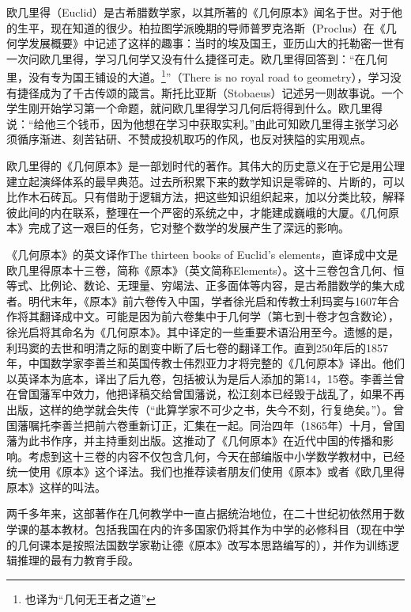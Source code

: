 \documentclass[b5paper]{ctexart}
\begin{document}
\begin{mdframed}

欧几里得（Euclid）是古希腊数学家，以其所著的《几何原本》闻名于世。对于他的生平，现在知道的很少。柏拉图学派晚期的导师普罗克洛斯（Proclus）在《几何学发展概要》中记述了这样的趣事：当时的埃及国王，亚历山大的托勒密一世有一次问欧几里得，学习几何学又没有什么捷径可走。欧几里得回答到：“在几何里，没有专为国王铺设的大道。\footnote{也译为“几何无王者之道”}”（There is no royal road to geometry），学习没有捷径成为了千古传颂的箴言。斯托比亚斯（Stobaeus）记述另一则故事说。一个学生刚开始学习第一个命题，就问欧几里得学习几何后将得到什么。欧几里得说：“给他三个钱币，因为他想在学习中获取实利。”由此可知欧几里得主张学习必须循序渐进、刻苦钻研、不赞成投机取巧的作风，也反对狭隘的实用观点\cite{Elements}。

欧几里得的《几何原本》是一部划时代的著作。其伟大的历史意义在于它是用公理建立起演绎体系的最早典范。过去所积累下来的数学知识是零碎的、片断的，可以比作木石砖瓦。只有借助于逻辑方法，把这些知识组织起来，加以分类比较，解释彼此间的内在联系，整理在一个严密的系统之中，才能建成巍峨的大厦。《几何原本》完成了这一艰巨的任务，它对整个数学的发展产生了深远的影响。

《几何原本》的英文译作The thirteen books of Euclid's elements，直译成中文是欧几里得原本十三卷，简称《原本》（英文简称Elements）。这十三卷包含几何、恒等式、比例论、数论、无理量、穷竭法、正多面体等内容，是古希腊数学的集大成者。明代末年，《原本》前六卷传入中国，学者徐光启和传教士利玛窦与1607年合作将其翻译成中文。可能是因为前六卷集中于几何学（第七到十卷才包含数论），徐光启将其命名为《几何原本》。其中译定的一些重要术语沿用至今。遗憾的是，利玛窦的去世和明清之际的剧变中断了后七卷的翻译工作。直到250年后的1857年，中国数学家李善兰和英国传教士伟烈亚力才将完整的《几何原本》译出。他们以英译本为底本，译出了后九卷，包括被认为是后人添加的第14，15卷。李善兰曾在曾国藩军中效力，他把译稿交给曾国藩说，松江刻本已经毁于战乱了，如果不再出版，这样的绝学就会失传（“此算学家不可少之书，失今不刻，行复绝矣。”）。曾国藩嘱托李善兰把前六卷重新订正，汇集在一起。同治四年（1865年）十月，曾国藩为此书作序，并主持重刻出版。这推动了《几何原本》在近代中国的传播和影响。考虑到这十三卷的内容不仅包含几何，今天在部编版中小学数学教材中，已经统一使用《原本》这个译法。我们也推荐读者朋友们使用《原本》或者《欧几里得原本》这样的叫法。

两千多年来，这部著作在几何教学中一直占据统治地位，在二十世纪初依然用于数学课的基本教材。包括我国在内的许多国家仍将其作为中学的必修科目（现在中学的几何课本是按照法国数学家勒让德《原本》改写本思路编写的），并作为训练逻辑推理的最有力教育手段\cite{HanXueTao16}。
\end{mdframed}
\end{document}
